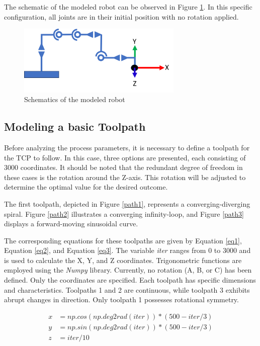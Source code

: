 The schematic of the modeled robot can be observed in Figure \ref{schema}. In this specific configuration, all joints are in their initial position with no rotation applied.


\begin{figure}[H]
	\centerline{\includegraphics[width=0.7\textwidth]{figures/schema.png}}
	\caption{Schematics of the modeled robot}
	\label{schema}
\end{figure}

\subsection{Modeling a basic Toolpath}\label{MBT}
Before analyzing the process parameters, it is necessary to define a toolpath for the \acrshort{TCP} to follow. In this case, three options are presented, each consisting of 3000 coordinates. It should be noted that the redundant degree of freedom in these cases is the rotation around the Z-axis. This rotation will be adjusted to determine the optimal value for the desired outcome.

The first toolpath, depicted in Figure \ref{path1}, represents a converging-diverging spiral. Figure \ref{path2} illustrates a converging infinity-loop, and Figure \ref{path3} displays a forward-moving sinusoidal curve.

The corresponding equations for these toolpaths are given by Equation \ref{eq1}, Equation \ref{eq2}, and Equation \ref{eq3}. The variable \textit{iter} ranges from 0 to 3000 and is used to calculate the X, Y, and Z coordinates. Trigonometric functions are employed using the \textit{Numpy} library. Currently, no rotation (A, B, or C) has been defined. Only the coordinates are specified. Each toolpath has specific dimensions and characteristics. Toolpaths 1 and 2 are continuous, while toolpath 3 exhibits abrupt changes in direction. Only toolpath 1 possesses rotational symmetry.

\begin{equation}\label{eq1}
\begin{split}
x &= np.cos(np.deg2rad(iter)) * (500 - iter / 3)\\
y &= np.sin(np.deg2rad(iter)) * (500 - iter / 3)\\
z &= iter / 10
\end{split}
\end{equation}


